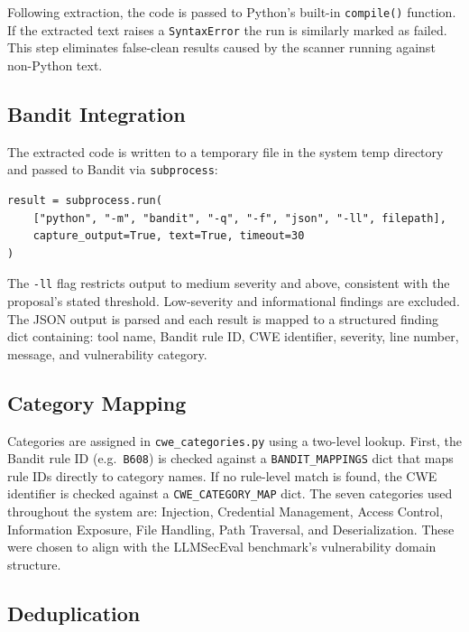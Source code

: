 \documentclass[12pt,a4paper]{report}
\begin{document}
Following extraction, the code is passed to Python's built-in \texttt{compile()}
function. If the extracted text raises a \texttt{SyntaxError} the run is
similarly marked as failed. This step eliminates false-clean results caused by
the scanner running against non-Python text.

\subsection{Bandit Integration}
\label{ssec:bandit}

The extracted code is written to a temporary file in the system temp directory
and passed to Bandit via \texttt{subprocess}:

\begin{lstlisting}[caption={Bandit invocation in \texttt{engine\_b\_scan.py}},
                   label={lst:bandit}]
result = subprocess.run(
    ["python", "-m", "bandit", "-q", "-f", "json", "-ll", filepath],
    capture_output=True, text=True, timeout=30
)
\end{lstlisting}

The \texttt{-ll} flag restricts output to medium severity and above, consistent
with the proposal's stated threshold. Low-severity and informational findings
are excluded. The JSON output is parsed and each result is mapped to a structured
finding dict containing: tool name, Bandit rule ID, CWE identifier, severity,
line number, message, and vulnerability category.

\subsection{Category Mapping}
\label{ssec:categorymap}

Categories are assigned in \texttt{cwe\_categories.py} using a two-level lookup.
First, the Bandit rule ID (e.g.\ \texttt{B608}) is checked against a
\texttt{BANDIT\_MAPPINGS} dict that maps rule IDs directly to category names.
If no rule-level match is found, the CWE identifier is checked against a
\texttt{CWE\_CATEGORY\_MAP} dict. The seven categories used throughout the
system are: Injection, Credential Management, Access Control, Information
Exposure, File Handling, Path Traversal, and Deserialization. These were chosen
to align with the LLMSecEval benchmark's vulnerability domain structure.

\subsection{Deduplication}
\label{ssec:dedup}
\end{document}
